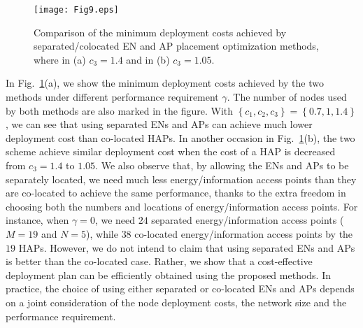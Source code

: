 \documentclass[journal, draftcls, one column, 12pt]{IEEEtran}
\begin{document}
\begin{figure}
\centering
  \begin{center}
    \texttt{[image: Fig9.eps]}
  \end{center}
  \caption{Comparison of the minimum deployment costs achieved by separated/colocated EN and AP placement optimization methods, where in (a) $c_3=1.4$ and in (b) $c_3=1.05$. }
  \label{72}
\end{figure}

In Fig.~\ref{72}(a), we show the minimum deployment costs achieved by the two methods under different performance requirement $\gamma$. The number of nodes used by both methods are also marked in the figure. With $\left\{c_1,c_2,c_3\right\} =\left\{0.7,1,1.4\right\}$, we can see that using separated ENs and APs can achieve much lower deployment cost than co-located HAPs. In another occasion in Fig.~\ref{72}(b), the two scheme achieve similar deployment cost when the cost of a HAP is decreased from $c_3=1.4$ to $1.05$. We also observe that, by allowing the ENs and APs to be separately located, we need much less energy/information access points than they are co-located to achieve the same performance, thanks to the extra freedom in choosing both the numbers and locations of energy/information access points. For instance, when $\gamma = 0$, we need $24$ separated energy/information access points ($M=19$ and $N=5$), while $38$ co-located energy/information access points by the $19$ HAPs. However, we do not intend to claim that using separated ENs and APs is better than the co-located case. Rather, we show that a cost-effective deployment plan can be efficiently obtained using the proposed methods. In practice, the choice of using either separated or co-located ENs and APs depends on a joint consideration of the node deployment costs, the network size and the performance requirement.
\end{document}
